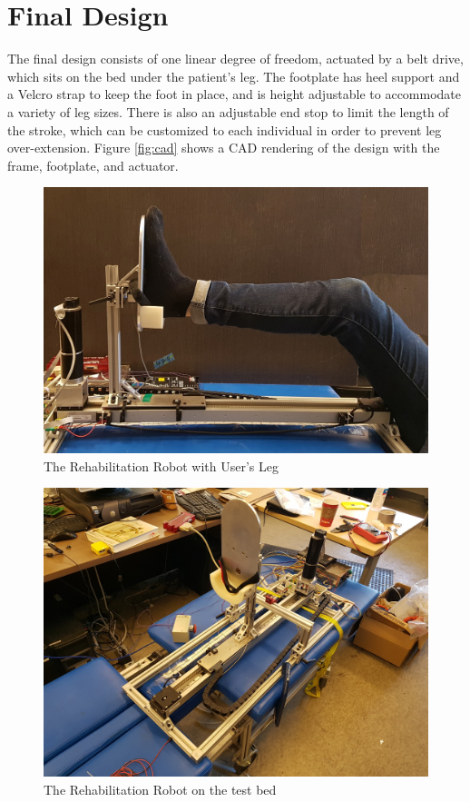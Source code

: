 \documentclass[12pt]{report}
\begin{document}
				

\section{Final Design} 

	The final design consists of one linear degree of freedom, actuated by a belt drive, which sits on the bed under the patient's leg. The footplate has heel support and a Velcro strap to keep the foot in place, and is height adjustable to accommodate a variety of leg sizes. There is also an adjustable end stop to limit the length of the stroke, which can be customized to each individual in order to prevent leg over-extension. Figure \ref{fig:cad} shows a CAD rendering of the design with the frame, footplate, and actuator.


	\begin{figure}[h] 
		\centering
		\includegraphics[width=0.75\linewidth]{robot_leg}
		\caption{The Rehabilitation Robot with User's Leg}
		\label{fig:robot_leg}
	\end{figure}
	
	\begin{figure}[h] 
		\centering
		\includegraphics[width=0.75\linewidth]{device_on_bed}
		\caption{The Rehabilitation Robot on the test bed}
		\label{fig:robot_on_bed}
	\end{figure}
\end{document}
